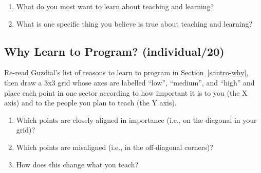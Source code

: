 \begin{enumerate}
\item
  What do you most want to learn about teaching and learning?
\item
  What is one specific thing you believe is true about teaching and
  learning?
\end{enumerate}

\subsection{Why Learn to Program? (individual/20)}\label{why-learn-to-program-individual20}

Re-read Guzdial's list of reasons to learn to program in
Section~\ref{s:intro-why}, then draw a 3x3 grid whose axes are labelled
``low'', ``medium'', and ``high'' and place each point in one sector
according to how important it is to you (the X axis) and to the people
you plan to teach (the Y axis).

\begin{enumerate}
\item
  Which points are closely aligned in importance (i.e., on the
  diagonal in your grid)?
\item
  Which points are misaligned (i.e., in the off-diagonal corners)?
\item
  How does this change what you teach?
\end{enumerate}
